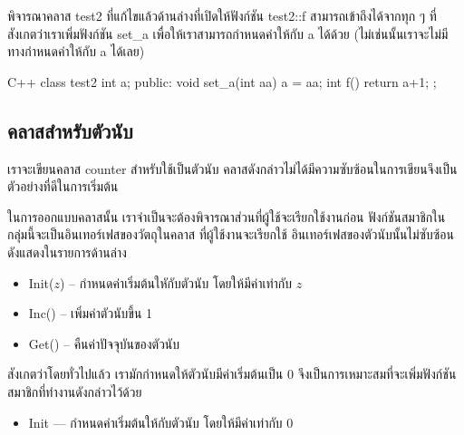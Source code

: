พิจารณา{\wbr}ค{\wbr}ลา{\wbr}ส {\ct test2}
ที่{\wbr}แก้ไข{\wbr}แล้ว{\wbr}ด้าน{\wbr}ล่าง{\wbr}ที่{\wbr}เปิด{\wbr}ให้{\wbr}ฟังก์ชัน {\ct test2::f} สามารถ{\wbr}เข้าถึง{\wbr}ได้{\wbr}จาก{\wbr}ทุก ๆ ที่{\wbr}
สังเกต{\wbr}ว่า{\wbr}เรา{\wbr}เพิ่ม{\wbr}ฟังก์ชัน {\ct set\_a} เพื่อให้{\wbr}เรา{\wbr}สามารถ{\wbr}กำหนด{\wbr}ค่า{\wbr}ให้{\wbr}กับ {\ct a}
ได้{\wbr}ด้วย (ไม่{\wbr}เช่นนั้น{\wbr}เรา{\wbr}จะ{\wbr}ไม่{\wbr}มี{\wbr}ทาง{\wbr}กำหนด{\wbr}ค่า{\wbr}ให้{\wbr}กับ {\ct a} ได้{\wbr}เลย)

\latintext
\begin{codelist}{C++}{}
class test2 { 
  int a; 
public: 
  void set_a(int aa) { a = aa; }
  int f() { return a+1; } 
};
\end{codelist}
\thaitext

\subsection{ค{\wbr}ลา{\wbr}ส{\wbr}สำหรับ{\wbr}ตัว{\wbr}นับ}
เรา{\wbr}จะ{\wbr}เขียน{\wbr}ค{\wbr}ลา{\wbr}ส {\ct counter} สำหรับ{\wbr}ใช้{\wbr}เป็น{\wbr}ตัว{\wbr}นับ{\wbr}
ค{\wbr}ลา{\wbr}ส{\wbr}ดังกล่าว{\wbr}ไม่{\wbr}ได้{\wbr}มี{\wbr}ความ{\wbr}ซับซ้อน{\wbr}ใน{\wbr}การ{\wbr}เขียน{\wbr}จึง{\wbr}เป็น{\wbr}ตัวอย่าง{\wbr}ที่{\wbr}ดี{\wbr}ใน{\wbr}การ{\wbr}เริ่มต้น{\wbr}

ใน{\wbr}การ{\wbr}ออกแบบ{\wbr}ค{\wbr}ลา{\wbr}ส{\wbr}นั้น เรา{\wbr}จำเป็น{\wbr}จะ{\wbr}ต้อง{\wbr}พิจารณา{\wbr}ส่วน{\wbr}ที่{\wbr}ผู้ใช้{\wbr}จะ{\wbr}เรียก{\wbr}ใช้{\wbr}งาน{\wbr}ก่อน{\wbr}
ฟังก์ชัน{\wbr}สมาชิก{\wbr}ใน{\wbr}กลุ่ม{\wbr}นี้{\wbr}จะ{\wbr}เป็น{\wbr}อิน{\wbr}เทอร์เฟส{\wbr}ของ{\wbr}วัตถุ{\wbr}ใน{\wbr}ค{\wbr}ลา{\wbr}ส ที่{\wbr}ผู้ใช้{\wbr}งาน{\wbr}จะ{\wbr}เรียก{\wbr}ใช้{\wbr}
อิน{\wbr}เทอร์เฟส{\wbr}ของ{\wbr}ตัว{\wbr}นับ{\wbr}นั้น{\wbr}ไม่{\wbr}ซับซ้อน ดัง{\wbr}แสดง{\wbr}ใน{\wbr}รายการ{\wbr}ด้าน{\wbr}ล่าง{\wbr}
\begin{itemize}
\item Init($z$) -- กำหนด{\wbr}ค่า{\wbr}เริ่มต้น{\wbr}ใหักับ{\wbr}ตัว{\wbr}นับ โดย{\wbr}ให้{\wbr}มี{\wbr}ค่า{\wbr}เท่า{\wbr}กับ $z$
\item Inc() -- เพิ่ม{\wbr}ค่าตัว{\wbr}นับ{\wbr}ขึ้น 1
\item Get() -- คืน{\wbr}ค่า{\wbr}ปัจจุบัน{\wbr}ของ{\wbr}ตัว{\wbr}นับ{\wbr}
\end{itemize}

สังเกต{\wbr}ว่า{\wbr}โดย{\wbr}ทั่วไป{\wbr}แล้ว เรา{\wbr}มัก{\wbr}กำหนด{\wbr}ให้{\wbr}ตัว{\wbr}นับ{\wbr}มี{\wbr}ค่า{\wbr}เริ่มต้น{\wbr}เป็น 0
จึง{\wbr}เป็น{\wbr}การ{\wbr}เหมาะสม{\wbr}ที่{\wbr}จะ{\wbr}เพิ่ม{\wbr}ฟังก์ชัน{\wbr}สมาชิก{\wbr}ที่ทำงาน{\wbr}ดังกล่าว{\wbr}ไว้{\wbr}ด้วย{\wbr}
\begin{itemize}
\item Init --- กำหนด{\wbr}ค่า{\wbr}เริ่มต้น{\wbr}ให้{\wbr}กับ{\wbr}ตัว{\wbr}นับ โดย{\wbr}ให้{\wbr}มี{\wbr}ค่า{\wbr}เท่า{\wbr}กับ 0
\end{itemize}

